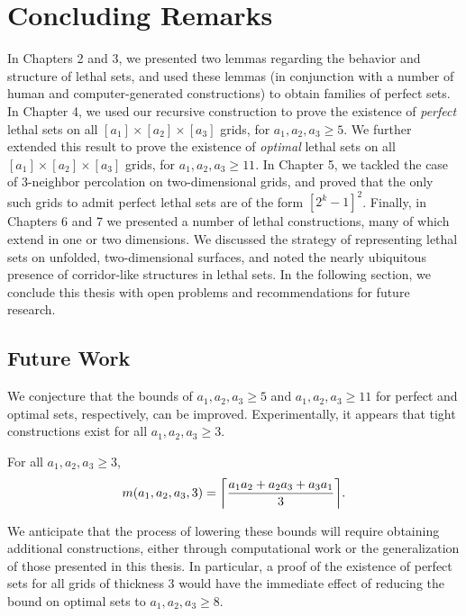 \chapter{Concluding Remarks}

In Chapters 2 and 3, we presented two lemmas regarding the behavior and structure of lethal sets, and used these lemmas (in conjunction with a number of human and computer-generated constructions) to obtain families of perfect sets. In Chapter 4, we used our recursive construction to prove the existence of \emph{perfect} lethal sets on all $[a_1] \times [a_2] \times [a_3]$ grids, for $a_1,a_2,a_3 \geq 5$. We further extended this result to prove the existence of \emph{optimal} lethal sets on all $[a_1] \times [a_2] \times [a_3]$ grids, for $a_1,a_2,a_3 \geq 11$. In Chapter 5, we tackled the case of 3-neighbor percolation on two-dimensional grids, and proved that the only such grids to admit perfect lethal sets are of the form $[2^k-1]^2$. Finally, in Chapters 6 and 7 we presented a number of lethal constructions, many of which extend in one or two dimensions. We discussed the strategy of representing lethal sets on unfolded, two-dimensional surfaces, and noted the nearly ubiquitous presence of corridor-like structures in lethal sets. In the following section, we conclude this thesis with open problems and recommendations for future research.

\section{Future Work}

We conjecture that the bounds of $a_1, a_2,a_3 \geq 5$ and $a_1, a_2,a_3 \geq 11$ for perfect and optimal sets, respectively, can be improved. Experimentally, it appears that tight constructions exist for all $a_1, a_2,a_3 \geq 3$. 

\begin{conj}
\label{conj:better_bound}
For all $a_1, a_2,a_3 \geq 3$,
$$m(a_1,a_2,a_3,3) = \ceil*{\frac{a_1a_2 +a_2a_3+a_3a_1}{3}}.$$
\end{conj}
We anticipate that the process of lowering these bounds will require obtaining additional constructions, either through computational work or the generalization of those presented in this thesis. In particular, a proof of the existence of perfect sets for all grids of thickness 3 would have the immediate effect of reducing the bound on optimal sets to $a_1, a_2,a_3 \geq 8$. 

